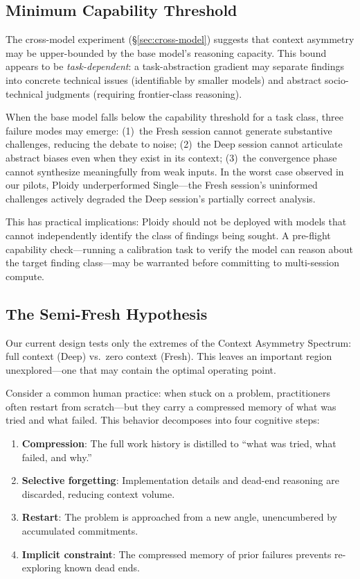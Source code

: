 \documentclass[11pt]{article}
\begin{document}
\subsection{Minimum Capability Threshold}
\label{sec:capability-threshold}

The cross-model experiment (\S\ref{sec:cross-model}) suggests that context asymmetry may be upper-bounded by the base model's reasoning capacity. This bound appears to be \emph{task-dependent}: a task-abstraction gradient may separate findings into concrete technical issues (identifiable by smaller models) and abstract socio-technical judgments (requiring frontier-class reasoning).

When the base model falls below the capability threshold for a task class, three failure modes may emerge: (1)~the Fresh session cannot generate substantive challenges, reducing the debate to noise; (2)~the Deep session cannot articulate abstract biases even when they exist in its context; (3)~the convergence phase cannot synthesize meaningfully from weak inputs. In the worst case observed in our pilots, Ploidy underperformed Single---the Fresh session's uninformed challenges actively degraded the Deep session's partially correct analysis.

This has practical implications: Ploidy should not be deployed with models that cannot independently identify the class of findings being sought. A pre-flight capability check---running a calibration task to verify the model can reason about the target finding class---may be warranted before committing to multi-session compute.

\subsection{The Semi-Fresh Hypothesis}
\label{sec:semifresh}

Our current design tests only the extremes of the Context Asymmetry Spectrum: full context (Deep) vs.\ zero context (Fresh). This leaves an important region unexplored---one that may contain the optimal operating point.

Consider a common human practice: when stuck on a problem, practitioners often restart from scratch---but they carry a compressed memory of what was tried and what failed. This behavior decomposes into four cognitive steps:

\begin{enumerate}[label=\arabic*., leftmargin=1.5em]
  \item \textbf{Compression}: The full work history is distilled to ``what was tried, what failed, and why.''
  \item \textbf{Selective forgetting}: Implementation details and dead-end reasoning are discarded, reducing context volume.
  \item \textbf{Restart}: The problem is approached from a new angle, unencumbered by accumulated commitments.
  \item \textbf{Implicit constraint}: The compressed memory of prior failures prevents re-exploring known dead ends.
\end{enumerate}
\end{document}
